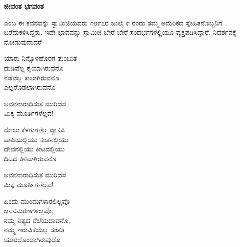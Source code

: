 \begin{myquote}
\end{myquote}

\selectkan

\begin{center}
\textbf{ಜೀವಂತ ಭಗವಂತ}
\end{center}

 ಎಂಬ ಈ ಕವನವನ್ನು ಸ್ವಾಮಿಜಿಯವರು ೧೮೯೭ರ ಜುಲೈ ೯ ರಂದು ತಮ್ಮ ಅಮೆರಿಕದ ಸ್ನೇಹಿತನೊಬ್ಬನಿಗೆ ಬರೆದುಕಳಿಸಿದ್ದರು. ಇದೇ ಭಾವವನ್ನು ಸ್ವಾಮಿಜಿ ಬೇರೆ ಬೇರೆ ಸಂದರ್ಭಗಳಲ್ಲಿಯೂ ವ್ಯಕ್ತಪಡಿಸಿದ್ದಾರೆ. ನಿದರ್ಶನಕ್ಕೆ ನೋಡುವುದಾದರೆ–

\begin{myquote}
ಯಾರು ನಿನ್ನೊಳಹೊರಗ ತುಂಬುತ\\ದುಡಿವೆಲ್ಲ ಕೈಯಾಗಿರುವನೊ\\ನಡೆವೆಲ್ಲ ಕಾಲಾಗಿರುವನೊ\\ಎಲ್ಲರೊಡಲಾಗಿರುವನೊ
\end{myquote}

\begin{myquote}
ಅವನನಾರಾದಿಸುತ ಮುರಿದೆಸೆ\\ಮಿಕ್ಕ ಮೂರ್ತಿಗಳೆಲ್ಲವ!
\end{myquote}

\begin{myquote}
ಮೇಲು ಕೆಳಗುಗಳೆಲ್ಲ ವ್ಯಾಪಿಸಿ\\ಪಾಪಿಯಲ್ಲಿಯು ಸಂತನಲ್ಲಿಯು\\ದೇವನಲ್ಲಿಯು ಕೀಟದಲ್ಲಿಯು\\ದಿಟದ ತಿಳಿವಾಗಿರುವನೊ
\end{myquote}

\begin{myquote}
ಅವನನಾರಾಧಿಸುತ ಮುರಿದೆಸೆ\\ಮಿಕ್ಕ ಮೂರ್ತಿಗಳೆಲ್ಲವ!
\end{myquote}

\begin{myquote}
ಹಿಂದು ಮುಂದುಗಳಾರಲಿಲ್ಲವೊ\\ಜನನಮರಣಗಳಿಲ್ಲವೊ,\\ನಮ್ಮ ನಿತ್ಯದ ನೆಲೆಯದಾವನೊ,\\ನಮ್ಮ ಇರುವಿಕೆಯೆಲ್ಲ ಸಂತತ\\ಯಾರಲೊಂದಾಗಿರುವುದೊ
\end{myquote}

